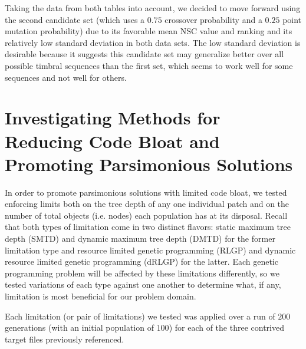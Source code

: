 \documentclass[12pt]{report} 	%
\numberwithin{figure}{chapter}
\numberwithin{table}{chapter}
\numberwithin{equation}{chapter}
\begin{document}
\begin{flushleft}
Taking the data from both tables into account, we decided to move forward using the second candidate set (which uses a $0.75$ crossover probability and a $0.25$ point mutation probability) due to its favorable mean NSC value and ranking and its relatively low standard deviation in both data sets. The low standard deviation is desirable because it suggests this candidate set may generalize better over all possible timbral sequences than the first set, which seems to work well for some sequences and not well for others.

\section{Investigating Methods for Reducing Code Bloat and Promoting Parsimonious Solutions}
In order to promote parsimonious solutions with limited code bloat, we tested enforcing limits both on the tree depth of any one individual patch and on the number of total objects (i.e. nodes) each population has at its disposal. Recall that both types of limitation come in two distinct flavors: static maximum tree depth (SMTD) and dynamic maximum tree depth (DMTD) for the former limitation type and resource limited genetic programming (RLGP) and dynamic resource limited genetic programming (dRLGP) for the latter. Each genetic programming problem will be affected by these limitations differently, so we tested variations of each type against one another to determine what, if any, limitation is most beneficial for our problem domain. 

Each limitation (or pair of limitations) we tested was applied over a run of $200$ generations (with an initial population of $100$) for each of the three contrived target files previously referenced.


\end{flushleft}
\end{document}
